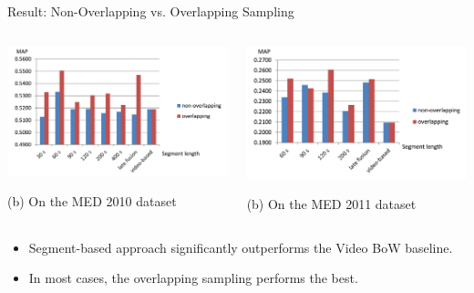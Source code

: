 \documentclass{beamer}
\begin{document}
\begin{frame}{Result: Non-Overlapping vs. Overlapping Sampling} 

\bigskip

\begin{columns}
  \begin{column}{0.5\textwidth}
    \centerline{\includegraphics[width=1\textwidth]{images/med10_result.png}}
    (b) On the MED 2010 dataset
  \end{column}

  \begin{column}{0.5\textwidth}
    \centerline{\includegraphics[width=1\textwidth]{images/med11_result.png}}
    (b) On the MED 2011 dataset
  \end{column}
\end{columns}
\bigskip

\begin{itemize}
	\item Segment-based approach significantly outperforms the Video BoW baseline.
	\item In most cases, the overlapping sampling performs the best.
\end{itemize} 

  
\end{frame}
\end{document}
